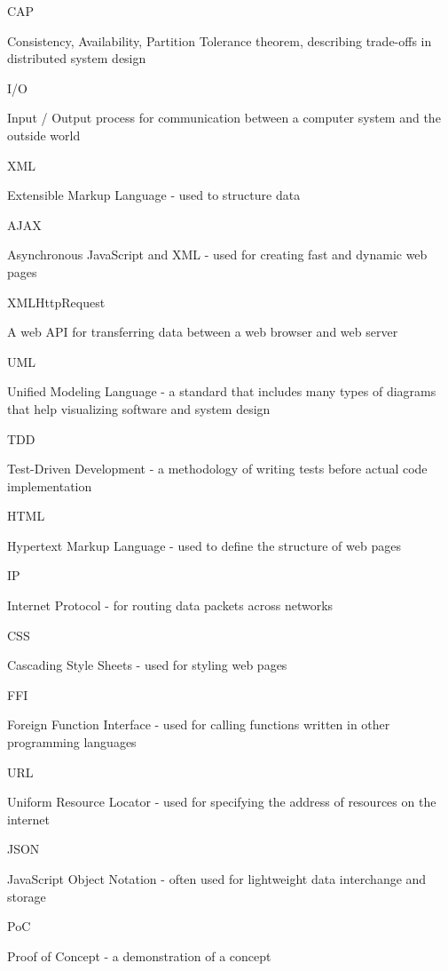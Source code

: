 \documentclass[]{final}
\begin{document}
CAP

Consistency, Availability, Partition Tolerance theorem, describing trade-offs in distributed system design

I/O

Input / Output process for communication between a computer system and the outside world

XML

Extensible Markup Language - used to structure data

AJAX

Asynchronous JavaScript and XML - used for creating fast and dynamic web pages

XMLHttpRequest

A web API for transferring data between a web browser and web server

UML

Unified Modeling Language - a standard that includes many types of diagrams that help visualizing software and system design

TDD

Test-Driven Development - a methodology of writing tests before actual code implementation

HTML

Hypertext Markup Language - used to define the structure of web pages

IP

Internet Protocol - for routing data packets across networks

CSS

Cascading Style Sheets - used for styling web pages

FFI

Foreign Function Interface - used for calling functions written in other programming languages

URL

Uniform Resource Locator - used for specifying the address of resources on the internet

JSON

JavaScript Object Notation - often used for lightweight data interchange and storage

PoC

Proof of Concept - a demonstration of a concept
\end{document}
